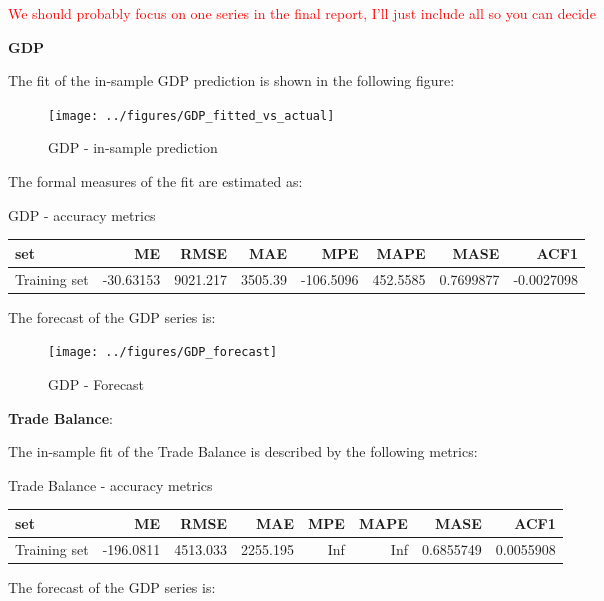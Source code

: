 \documentclass[
]{article}
\begin{document}
\textcolor{red}{We should probably focus on one series in the final report, I'll just include all so you can decide}

\textbf{GDP}

The fit of the in-sample GDP prediction is shown in the following
figure:

\begin{figure}

{\centering \texttt{[image: ../figures/GDP\_fitted\_vs\_actual]} 

}

\caption{GDP - in-sample prediction}\label{fig:unnamed-chunk-14}
\end{figure}

The formal measures of the fit are estimated as:

\bgroup \table[H]
\centering
\caption{\label{tab:unnamed-chunk-15}GDP - accuracy metrics}
\centering
\begin{tabular}[t]{lrrrrrrr}
\toprule
set & ME & RMSE & MAE & MPE & MAPE & MASE & ACF1\\
\midrule
Training set & -30.63153 & 9021.217 & 3505.39 & -106.5096 & 452.5585 & 0.7699877 & -0.0027098\\
\bottomrule
\end{tabular}
\endtable\egroup

The forecast of the GDP series is:

\begin{figure}

{\centering \texttt{[image: ../figures/GDP\_forecast]} 

}

\caption{GDP - Forecast}\label{fig:unnamed-chunk-16}
\end{figure}

\textbf{Trade Balance}:

The in-sample fit of the Trade Balance is described by the following
metrics:

\bgroup \table[H]
\centering
\caption{\label{tab:unnamed-chunk-17}Trade Balance - accuracy metrics}
\centering
\begin{tabular}[t]{lrrrrrrr}
\toprule
set & ME & RMSE & MAE & MPE & MAPE & MASE & ACF1\\
\midrule
Training set & -196.0811 & 4513.033 & 2255.195 & Inf & Inf & 0.6855749 & 0.0055908\\
\bottomrule
\end{tabular}
\endtable\egroup

The forecast of the GDP series is:
\end{document}
